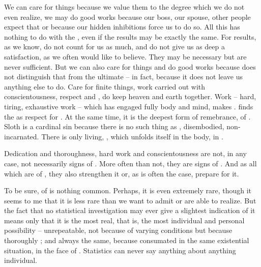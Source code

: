 We can care for things because we value them to the degree which we do
not even realize, we may do good works because our boss, our spouse,
other people expect that or because our hidden inhibitions force us to
do so. All this has nothing to do with the , even if the
 results may be exactly the same. For
 results, as we know, do not count for us as much, and do
not give us as deep a satisfaction, as we often would like to
believe. They may be necessary but are never sufficient.  But we can
also care for things and do good works because  does not
distinguish that from the ultimate  -- in fact, because
it does not leave us anything else to do.  Care for finite things,
work carried out with conscientousness, respect and , do
keep heaven and earth together. Work -- hard, tiring, exhaustive work
-- which has engaged fully body and mind, makes .  finds the  as respect for
. At the same time, it is the deepest form of
remebrance,  of .  Sloth is a cardinal
sin because there is no such thing as , disembodied,
non-incarnated. There is only living, , which
unfolds itself in the body, in .

Dedication and thoroughness, hard work and conscientousness are not,
in any case, not necessarily signs of . More often than not,
they are signs of . And as all  which are 
of , they also strengthen it or, as is often the case, prepare for
it.  


\pa To be sure,  of  is nothing
common. Perhaps, it is even extremely rare, though it seems to me that
it is less rare than we want to admit or are able to realize.  But the
fact that no statistical investigation may ever give a slightest
indication of it means only that it is the most real, that is, the
most individual and personal possibility -- unrepeatable, not because
of varying  conditions but because thoroughly
; and always the same, because consumated in the same
existential situation, in the face of . Statistics
can never say anything about anything individual.

